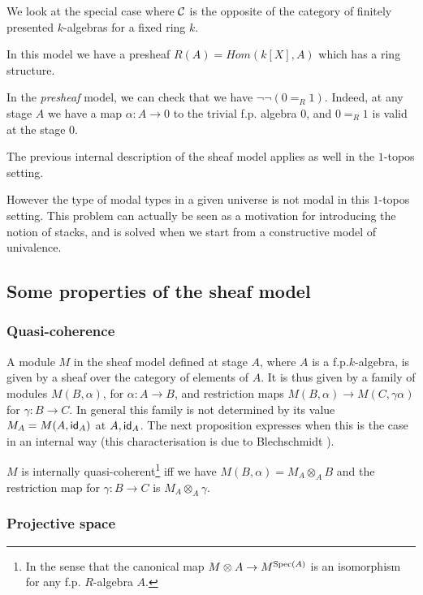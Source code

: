 We look at the special case where $\mathcal{C}$ is the opposite of the category of finitely presented $k$-algebras for a fixed
ring $k$.

    In this model we have a presheaf $R(A) = Hom(k[X],A)$ which has a ring structure.

    In the {\em presheaf} model, we can check that we have $\neg\neg (0=_R 1)$. Indeed, at any stage $A$ we have
    a map $\alpha:A\rightarrow 0$ to the trivial f.p. algebra $0$, and $0 =_R 1$ is valid at the stage $0$.

    The previous internal description of the sheaf model applies as well in the $1$-topos setting.

    \medskip

    However the type of modal types in a given universe is not modal in this $1$-topos setting. This problem can actually be seen as a
    motivation for introducing the notion of stacks, and is solved when we start from a constructive model of univalence.

    \subsection{Some properties of the sheaf model}

    \subsubsection{Quasi-coherence}

A module $M$ in the sheaf model defined at stage $A$, where $A$ is a f.p.\@ $k$-algebra, is given by a sheaf over the category
of elements of $A$. It is thus given by a family of modules $M(B,\alpha)$, for $\alpha:A\rightarrow B$, and restriction maps
$M(B,\alpha)\rightarrow M(C,\gamma\alpha)$ for $\gamma:B\rightarrow C$. In general this family is not determined by
its value $M_A = M(A,\mathsf{id}_A)$ at $A,\mathsf{id}_A$. The next proposition expresses when this is the case in an internal way
(this characterisation is due to Blechschmidt \cite{ingo-thesis}).

\begin{proposition}
  $M$ is internally quasi-coherent\footnote{In the sense that the canonical map $M\otimes A\rightarrow M^{\operatorname{Spec}(A)}$ is an isomorphism for any
  f.p. $R$-algebra $A$.} iff we have $M(B,\alpha) = M_A\otimes_A B$ and the restriction map for
  $\gamma:B\rightarrow C$ is $M_A\otimes_A\gamma$.
\end{proposition}

    \subsubsection{Projective space}


